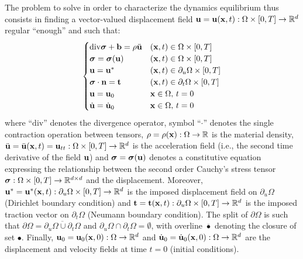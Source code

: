 The problem to solve in order to characterize the dynamics equilibrium thus consists in finding a vector-valued displacement field ${\bf{u}}={\bf{u}}({\bf{x}},t):\Omega\times[0,T]\to\mathbb{R}^{d}$
regular ``enough'' and such that: 
\begin{equation}
\begin{cases}
\mathrm{\mathrm{div}}\mbox{\boldmath${\sigma}$}+{\bf{b}}=\rho\ddot{{\bf{u}}} & ({\bf{x}},t)\in\Omega\times[0,T]\\
\mbox{\boldmath${\sigma}$}=\mbox{\boldmath${\sigma}$}({\bf{u}}) & ({\bf{x}},t)\in\Omega\times[0,T]\\
{\bf{u}}={\bf{u}}^{*} & ({\bf{x}},t)\in\partial_{u}\Omega\times[0,T]\\
\mbox{\boldmath${\sigma}$}\cdot{\bf{n}}={\bf t} & ({\bf{x}},t)\in\partial_{t}\Omega\times[0,T]\\
{\bf{u}}={\bf{u}}_{0} & {\bf{x}}\in\Omega,\,t=0\\
\dot{{\bf{u}}}=\dot{{\bf{u}}}_{0} & {\bf{x}}\in\Omega,\,t=0
\end{cases}
\end{equation}
where ``$\mathrm{\mathrm{div}}$'' denotes the divergence operator, symbol ``$\cdot$'' denotes the single contraction operation between tensors, $\rho=\rho({\bf{x}}):\Omega\to\mathbb{R}$ is the material density,
$\ddot{{\bf{u}}}=\ddot{{\bf{u}}}({\bf{x}},t)={\bf{u}}_{tt}:\Omega\times[0,T]\to\mathbb{R}^{d}$ is the acceleration field (i.e., the second time derivative of the field ${\bf{u}}$) and $\mbox{\boldmath${\sigma}$}=\mbox{\boldmath${\sigma}$}({\bf{u}})$ denotes a constitutive equation
expressing the relationship between the second order Cauchy's stress tensor $\mbox{\boldmath${\sigma}$}:\Omega\times[0,T]\to\mathbb{R}^{d\times d}$ and the displacement. Moreover, ${\bf{u}}^{*}={\bf{u}}^{*}({\bf{x}},t):\partial_{u}\Omega\times[0,T]\to\mathbb{R}^{d}$ is the imposed displacement field on $\partial_{u}\Omega$ (Dirichlet
boundary condition) and 
${\bf t}={\bf t}({\bf{x}},t):\partial_{u}\Omega\times[0,T]\to\mathbb{R}^{d}$
is the imposed traction vector on $\partial_{t}\Omega$ (Neumann boundary condition). The split of $\partial\Omega$ is such that $\partial\Omega=\overline{\partial_{u}\Omega\cup\partial_{t}\Omega}$ and $\partial_{u}\Omega\cap\partial_{t}\Omega=\emptyset$, with overline $\overline{\bullet}$ denoting the closure of set $\bullet$. Finally,
${\bf{u}}_{0}={\bf{u}}_{0}({\bf{x}},0):\Omega\to\mathbb{R}^{d}$ and $\dot{{\bf{u}}}_{0}=\dot{{\bf{u}}}_{0}({\bf{x}},0):\Omega\to\mathbb{R}^{d}$
are the displacement and velocity fields at time $t=0$ (initial conditions).

